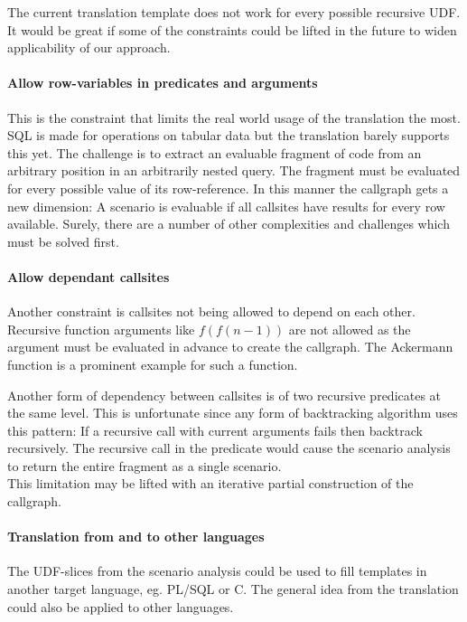 The current translation template does not work for every possible recursive UDF. It would be great if some of the constraints could be lifted in the future to widen applicability of our approach.

\paragraph*{Allow row-variables in predicates and arguments}
This is the constraint that limits the real world usage of the translation the most. SQL is made for operations on tabular data but the translation barely supports this yet. The challenge is to extract an evaluable fragment of code from an arbitrary position in an arbitrarily nested query. The fragment must be evaluated for every possible value of its row-reference. In this manner the callgraph gets a new dimension: A scenario is evaluable if all callsites have results for every row available. Surely, there are a number of other complexities and challenges which must be solved first.

\paragraph*{Allow dependant callsites}
Another constraint is callsites not being allowed to depend on each other. Recursive function arguments like $f(f(n-1))$ are not allowed as the argument must be evaluated in advance to create the callgraph. The Ackermann function is a prominent example for such a function.

Another form of dependency between callsites is of two recursive predicates at the same level. This is unfortunate since any form of backtracking algorithm uses this pattern: If a recursive call with current arguments fails then backtrack recursively. The recursive call in the predicate would cause the scenario analysis to return the entire fragment as a single scenario.\\
This limitation may be lifted with an iterative partial construction of the callgraph.

\paragraph*{Translation from and to other languages}

The UDF-slices from the scenario analysis could be used to fill templates in another target language, eg. PL/SQL or C. The general idea from the translation could also be applied to other languages.

